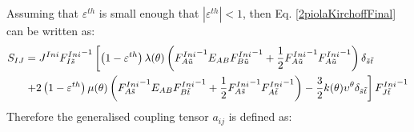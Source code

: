 \documentclass[oneside,11pt,times]{book}
\begin{document}
Assuming that $\varepsilon^{th}$ is small enough that $|\varepsilon^{th}|<1$, then  Eq. \eqref{2piolaKirchoffFinal} can be written as:
\begin{equation}
\begin{split}
\centering
S_{IJ} &=J^{Ini}{{F}^{Ini}_{I\tilde{s}}}^{-1}\left[\left(1-\varepsilon^{th}\right)\lambda (\theta) \left({{F}^{Ini}_{A\tilde{u}}}^{-1}{E}_{AB}{{F}^{Ini}_{B\tilde{u}}}^{-1}+\frac{1}{2}{{F}^{Ini}_{A\tilde{u}}}^{-1}{{F}^{Ini}_{A\tilde{u}}}^{-1}\right)\delta_{\tilde{s}\tilde{t}}\right.\\ &\left.+2 \left(1-\varepsilon^{th}\right) \mu (\theta)\left({{F}^{Ini}_{A\tilde{s}}}^{-1}{E}_{AB}{{F}^{Ini}_{B\tilde{t}}}^{-1}+\frac{1}{2}{{F}^{Ini}_{A\tilde{s}}}^{-1}{{F}^{Ini}_{A\tilde{t}}}^{-1}\right)-\frac{3}{2}k(\theta){\upsilon^{\theta}}\delta_{\tilde{s}\tilde{t}}\right]{{F}^{Ini}_{J\tilde{t}}}^{-1}
\end{split}
\label{2piolaKirchoff}
\end{equation}
Therefore the generalised coupling tensor $a_{ij}$ is defined as:
\end{document}
